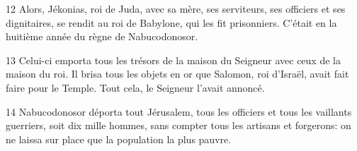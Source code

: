 
12 Alors, Jékonias, roi de Juda, avec sa mère, ses serviteurs, ses officiers et ses dignitaires, se rendit au roi de Babylone, qui les fit prisonniers. C’était en la huitième année du règne de Nabucodonosor.

13 Celui-ci emporta tous les trésors de la maison du Seigneur avec ceux de la maison du roi. Il brisa tous les objets en or que Salomon, roi d’Israël, avait fait faire pour le Temple. Tout cela, le Seigneur l’avait annoncé.

14 Nabucodonosor déporta tout Jérusalem, tous les officiers et tous les vaillants guerriers, soit dix mille hommes, sans compter tous les artisans et forgerons: on ne laissa sur place que la population la plus pauvre.
